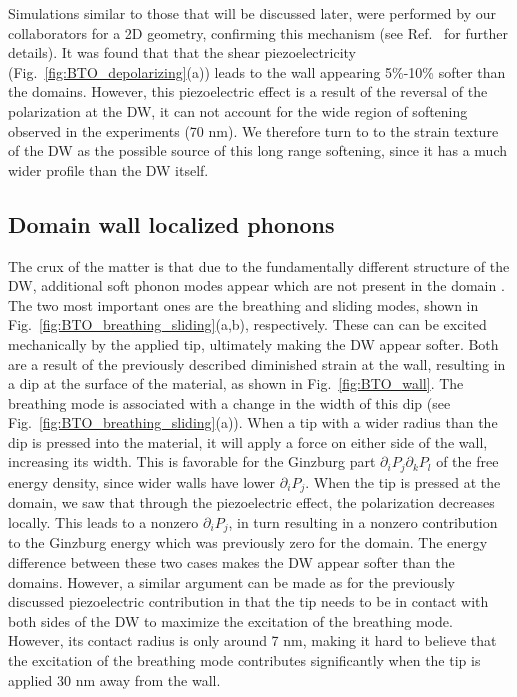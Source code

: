 Simulations similar to those that will be discussed later, were performed by our collaborators for a 2D geometry, confirming this mechanism (see Ref.~\cite{Stefani2020} for further details).
It was found that that the shear piezoelectricity (Fig.~\ref{fig:BTO_depolarizing}(a)) leads to the wall appearing 5\%-10\% softer than the domains.
However, this piezoelectric effect is a result of the reversal of the polarization at the DW, it can not account for the wide region of softening observed in the experiments (70 nm).
We therefore turn to to the strain texture of the DW as the possible source of this long range softening, since it has a much wider profile than the DW itself.

\subsection{Domain wall localized phonons}
The crux of the matter is that due to the fundamentally different structure of the DW, additional soft phonon modes appear which are not present in the domain \cite{Chen2020}.
The two most important ones are the breathing and sliding modes, shown in Fig.~\ref{fig:BTO_breathing_sliding}(a,b), respectively.
These can can be excited mechanically by the applied tip, ultimately making the DW appear softer.
Both are a result of the previously described diminished strain at the wall, resulting in a dip at the surface of the material, as shown in Fig.~\ref{fig:BTO_wall}.
The breathing mode is associated with a change in the width of this dip (see Fig.~\ref{fig:BTO_breathing_sliding}(a)).
When a tip with a wider radius than the dip is pressed into the material, it will apply a force on either side of the wall, increasing its width.
This is favorable for the Ginzburg part $\partial_i P_j \partial_k P_l$ of the free energy density, since wider walls have lower $\partial_i P_j$.
When the tip is pressed at the domain, we saw that through the piezoelectric effect, the polarization decreases locally.
This leads to a nonzero $\partial_i P_j$, in turn resulting in a nonzero contribution to the Ginzburg energy which was previously zero for the domain.
The energy difference between these two cases makes the DW appear softer than the domains.
However, a similar argument can be made as for the previously discussed piezoelectric contribution in that the tip needs to be in contact with both sides of the DW to maximize the excitation of the breathing mode.
However, its contact radius is only around 7 nm, making it hard to believe that the excitation of the breathing mode contributes significantly when the tip is applied 30 nm away from the wall.
